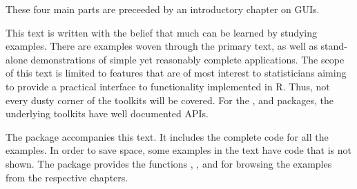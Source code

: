 These four main parts are preceeded by an introductory chapter on GUIs.

This text is written with the belief that much can be learned by
studying examples. There are examples woven through the primary text,
as well as stand-alone demonstrations of simple yet reasonably
complete applications. The scope of this text is limited to features
that are of most interest to statisticians aiming to provide a
practical interface to functionality implemented in R. Thus, not every
dusty corner of the toolkits will be covered. For the ,
 and  packages, the underlying toolkits have
well documented APIs.

The package \pkg{\PACKAGENAME} accompanies this text. It includes the
complete code for all the examples. In order to save space, some
examples in the text have code that is not shown. The package provides
the functions , ,
 and  for browsing the
examples from the respective chapters. 


